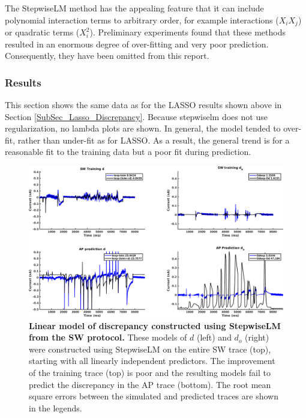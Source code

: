 \documentclass[11pt,a4paper,oneside]{article}
\begin{document}
The StepwiseLM method has the appealing feature that it can include polynomial interaction terms to arbitrary order, for example interactions ($X_iX_j$) or quadratic terms ($X_i^2$). Preliminary experiments found that these methods resulted in an enormous degree of over-fitting and very poor prediction. Consequently, they have been omitted from this report.

\subsubsection{Results}\label{SubSubSec_StepwiseLM_Results}
This section shows the same data as for the LASSO results shown above in Section \ref{SubSec_Lasso_Discrepancy}. Because stepwiselm does not use regularization, no lambda plots are shown. In general, the model tended to over-fit, rather than under-fit as for LASSO. As a result, the general trend is for a reasonable fit to the training data but a poor fit during prediction.

\begin{figure}[t]
\begin{center}
\includegraphics[scale=0.42]{Figures/StepwiseLM_SW_AP_full_discrepancy.png}
\caption{\textbf{Linear model of discrepancy constructed using StepwiseLM from the SW protocol.} These models of $d$ (left) and $d_o$ (right) were constructed using StepwiseLM on the entire SW trace (top), starting with all linearly independent predictors. The improvement of the training trace (top) is poor and the resulting models fail to predict the discrepancy in the AP trace (bottom). The root mean square errors between the simulated and predicted traces are shown in the legends. } 
\label{Fig_StepwiseLM_SW_AP_full_discrepancy}
\end{center}
\end{figure}
\end{document}
